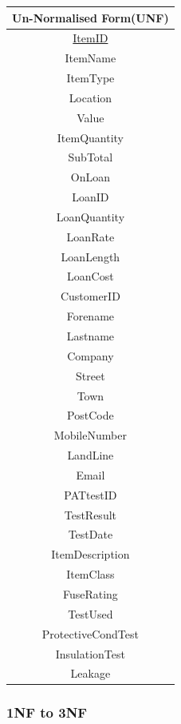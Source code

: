 \begin{center}
    \begin{tabular}{|c|}
        \hline
        \textbf{Un-Normalised Form(UNF)}\\ \hline
        \underline{ItemID}\\
        ItemName\\
        ItemType\\
        Location\\ 
        Value\\ 
        ItemQuantity\\ 
        SubTotal\\ 
        OnLoan\\ 
        LoanID\\ 
        LoanQuantity\\ 
        LoanRate\\ 
        LoanLength\\ 
        LoanCost\\ 
        CustomerID\\ 
        Forename\\ 
        Lastname\\ 
        Company\\ 
        Street\\ 
        Town\\ 
        PostCode\\ 
        MobileNumber\\ 
        LandLine\\ 
        Email\\ 
        PATtestID\\
        TestResult\\ 
        TestDate\\ 
        ItemDescription\\ 
        ItemClass\\ 
        FuseRating\\ 
        TestUsed\\ 
        ProtectiveCondTest\\ 
        InsulationTest\\ 
        Leakage\\ \hline
    \end{tabular}
\end{center}

\newpage

\subsubsection{1NF to 3NF}

